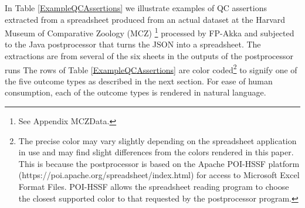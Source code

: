 \documentclass{article}
\begin{document}
In Table  \ref{ExampleQCAssertions}
we illustrate examples of QC assertions extracted from a spreadsheet produced from an actual dataset at the Harvard Museum of Comparative Zoology (MCZ)
\footnote{See Appendix MCZData.} processed by FP-Akka and subjected to the Java postprocessor that turns the JSON into a spreadsheet. 
The extractions are from several of the six sheets in the outputs of  the postprocessor runs
The rows of Table \ref{ExampleQCAssertions} are color coded\footnote{The precise color may vary slightly depending on the spreadsheet application in use and may find slight differences from the colors rendered in this paper. This is because the postprocessor is based on the Apache POI-HSSF platform (https://poi.apache.org/spreadsheet/index.html) for access to Microsoft Excel Format Files. POI-HSSF allows the spreadsheet reading program to choose the closest supported color to that requested by the postprocessor program.} to signify one of the five outcome types as described in the next section. For ease of human consumption, each of the outcome types is rendered in natural language. 



\end{document}
